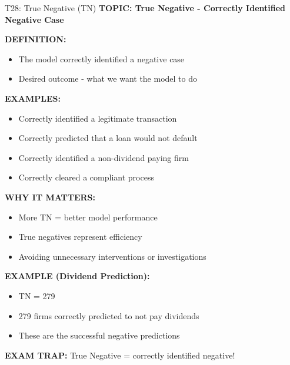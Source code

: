\documentclass[8pt]{beamer}
\begin{document}
	\begin{frame}{T28: True Negative (TN)}
		\fontsize{6.5}{7.5}\selectfont
		\textbf{TOPIC: True Negative - Correctly Identified Negative Case}
		
		\vspace{0.1cm}
		\textbf{DEFINITION:}
		\begin{itemize}
			\item The model correctly identified a negative case
			\item Desired outcome - what we want the model to do
		\end{itemize}
		
		\vspace{0.1cm}
		\textbf{EXAMPLES:}
		\begin{itemize}
			\item Correctly identified a legitimate transaction
			\item Correctly predicted that a loan would not default
			\item Correctly identified a non-dividend paying firm
			\item Correctly cleared a compliant process
		\end{itemize}
		
		\vspace{0.1cm}
		\textbf{WHY IT MATTERS:}
		\begin{itemize}
			\item More TN = better model performance
			\item True negatives represent efficiency
			\item Avoiding unnecessary interventions or investigations
		\end{itemize}
		
		\vspace{0.1cm}
		\textbf{EXAMPLE (Dividend Prediction):}
		\begin{itemize}
			\item TN = 279
			\item 279 firms correctly predicted to not pay dividends
			\item These are the successful negative predictions
		\end{itemize}
		
		\textcolor{myred}{\textbf{EXAM TRAP:}} True Negative = \textcolor{myblue}{correctly identified negative}!
	\end{frame}
	
\end{document}
